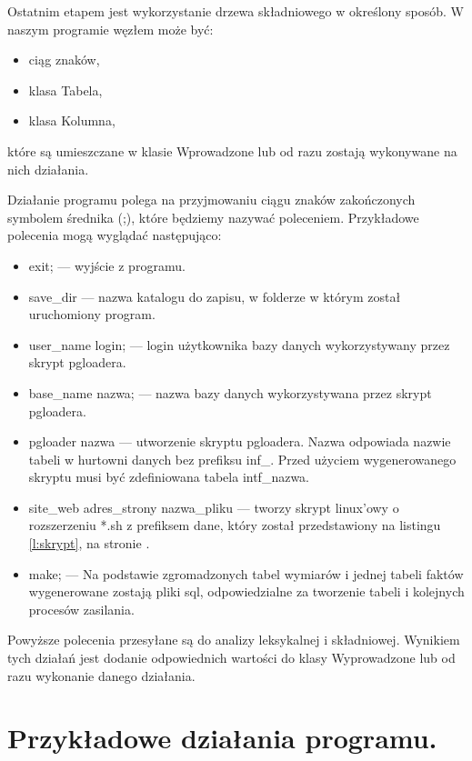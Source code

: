 Ostatnim etapem jest wykorzystanie drzewa składniowego w określony sposób. W naszym programie węzłem może być:

 \begin{itemize}
  \item ciąg znaków,
  \item klasa Tabela,
  \item klasa Kolumna,
 \end{itemize}
które są umieszczane w klasie Wprowadzone lub od razu zostają wykonywane na nich działania.

Działanie programu polega na przyjmowaniu ciągu znaków zakończonych symbolem średnika (;), które będziemy nazywać poleceniem.
Przykładowe polecenia mogą wyglądać następująco:

\begin{itemize}
 \item exit; --- 
    wyjście z programu.
 \item save\_dir --- 
    nazwa katalogu do zapisu, w folderze w którym został uruchomiony program.
 \item user\_name login;  ---
    login użytkownika bazy danych wykorzystywany przez skrypt pgloadera.
 \item base\_name nazwa; ---
    nazwa bazy danych wykorzystywana przez skrypt pgloadera.
 \item pgloader nazwa --- 
    utworzenie skryptu pgloadera. Nazwa odpowiada nazwie tabeli w hurtowni danych bez prefiksu inf\_. Przed użyciem wygenerowanego skryptu musi być zdefiniowana tabela intf\_nazwa.
 \item site\_web adres\_strony nazwa\_pliku ---
    tworzy skrypt linux'owy o rozszerzeniu *.sh z prefiksem dane, który został przedstawiony na listingu \ref{l:skrypt}, na stronie \pageref{l:skrypt}.
 \item make; ---
   Na podstawie zgromadzonych tabel wymiarów i jednej tabeli faktów wygenerowane zostają pliki sql, odpowiedzialne za tworzenie tabeli i kolejnych procesów zasilania.
\end{itemize}

Powyższe polecenia przesyłane są do analizy leksykalnej i składniowej. 
Wynikiem tych działań jest dodanie odpowiednich wartości do klasy Wyprowadzone lub od razu wykonanie danego działania.

 
\section{Przykładowe działania programu.}  \label{p_r_przyklady}

